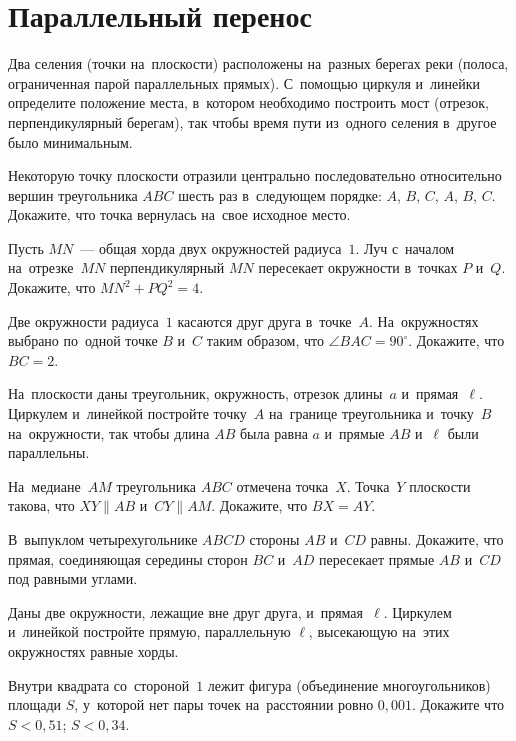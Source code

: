
\section*{Параллельный перенос}


\begin{problems}

\item
Два селения (точки на~плоскости) расположены на~разных берегах реки
(полоса, ограниченная парой параллельных прямых).
С~помощью циркуля и~линейки определите положение места, в~котором необходимо
построить мост (отрезок, перпендикулярный берегам), так чтобы время пути
из~одного селения в~другое было минимальным.

\item
Некоторую точку плоскости отразили центрально последовательно относительно
вершин треугольника $ABC$ шесть раз в~следующем порядке:
$A$, $B$, $C$, $A$, $B$, $C$.
Докажите, что точка вернулась на~свое исходное место.

\item
Пусть $MN$~--- общая хорда двух окружностей радиуса~$1$.
Луч с~началом на~отрезке~$MN$ перпендикулярный $MN$ пересекает окружности
в~точках $P$ и~$Q$.
Докажите, что $MN^2 + PQ^2 = 4$.

\item
Две окружности радиуса~$1$ касаются друг друга в~точке~$A$.
На~окружностях выбрано по~одной точке $B$ и~$C$ таким образом, что
$\angle BAC = 90^{\circ}$.
Докажите, что $BC = 2$.

\item
На~плоскости даны треугольник, окружность, отрезок длины~$a$ и~прямая~$\ell$.
Циркулем и~линейкой постройте точку~$A$ на~границе треугольника и~точку~$B$
на~окружности, так чтобы длина $AB$ была равна $a$ и~прямые $AB$ и~$\ell$ были
параллельны.

\item
На~медиане~$AM$ треугольника $ABC$ отмечена точка~$X$.
Точка~$Y$ плоскости такова, что $XY \parallel AB$ и~$CY \parallel AM$.
Докажите, что $BX = AY$.

\item
В~выпуклом четырехугольнике $ABCD$ стороны $AB$ и~$CD$ равны.
Докажите, что прямая, соединяющая середины сторон $BC$ и~$AD$ пересекает прямые
$AB$ и~$CD$ под равными углами.

\item
Даны две окружности, лежащие вне друг друга, и~прямая~$\ell$.
Циркулем и~линейкой постройте прямую, параллельную $\ell$, высекающую на~этих
окружностях равные хорды.

\item
Внутри квадрата со~стороной~$1$ лежит фигура (объединение многоугольников)
площади $S$, у~которой нет пары точек на~расстоянии ровно $0{,}001$.
Докажите что
\\
\subproblem $S < 0{,}51$;
\quad
\subproblem $S < 0{,}34$.

\end{problems}

